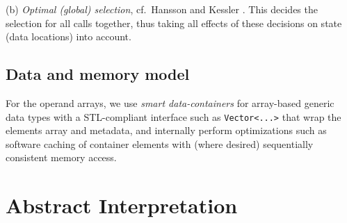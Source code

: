 \documentclass{article}
\begin{document}
(b) \emph{Optimal (global) selection}, cf.\ Hansson and Kessler \cite{Hansson2015}.
This decides the selection for all calls 
together, thus taking all effects of these
decisions on state
(data locations) into account.

\subsection{Data and memory model}

For the operand arrays, 
we use \emph{smart data-containers} 
\cite{Dastgeer2016}
for array-based generic data types 
with a STL-compliant interface such as \verb+Vector<...>+ that wrap
the elements array and metadata, and internally
perform optimizations such as software caching
of container elements with (where desired)
sequentially consistent memory access.


\section{Abstract Interpretation}



\end{document}
